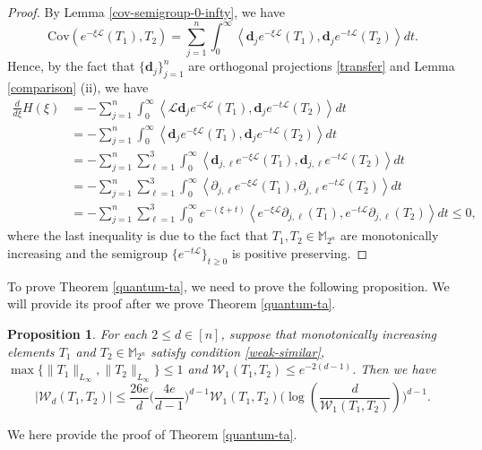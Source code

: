 \documentclass{amsbook}
\newtheorem{proposition}[theorem]{Proposition}
\theoremstyle{definition}
\theoremstyle{remark}
\numberwithin{section}{chapter}
\numberwithin{equation}{chapter}
\newcommand{\M}{\mathbb{M}}
\newcommand{\1}{\mathbf{1}}
\newcommand{\La}{\mathcal{L}}
\newcommand{\dc}{\mathbf{d}}
\begin{document}
\begin{proof}
 By Lemma \ref{cov-semigroup-0-infty}, we have
	\[
	\mathrm{Cov}\left(e^{-\xi\La}(T_1),T_2\right)=\sum_{j=1}^{n}\int_{0}^{\infty}\left\langle\dc_{j}e^{-\xi \La}(T_1),\dc_{j}e^{-t\La}(T_2)\right\rangle dt.
	\]
	Hence, by the fact that $\{\dc_{j}\}_{j=1}^{n}$ are orthogonal projections \eqref{transfer} and Lemma \ref{comparison} (ii), we have
	\begin{equation}\label{derivative-1}
		\begin{split}
			\frac{d}{d\xi}H(\xi)&=-\sum_{j=1}^{n}\int_{0}^{\infty}\left\langle\La\dc_{j}e^{-\xi\La}(T_1),\dc_{j}e^{-t\La}(T_2)\right\rangle dt\\
			&=-\sum_{j=1}^{n}\int_{0}^{\infty}\left\langle\dc_{j}e^{-\xi\La}(T_1),\dc_{j}e^{-t\La}(T_2)\right\rangle dt\\
			&=-\sum_{j=1}^{n}\sum_{\ell=1}^{3}\int_{0}^{\infty}\left\langle\dc_{j,\ell}e^{-\xi\La}(T_1),\dc_{j,\ell}e^{-t\La}(T_2)\right\rangle dt\\
			&=-\sum_{j=1}^{n}\sum_{\ell=1}^{3}\int_{0}^{\infty}\left\langle\partial_{j,\ell}e^{-\xi\La}(T_1),\partial_{j,\ell}e^{-t\La}(T_2)\right\rangle dt\\
			&=-\sum_{j=1}^{n}\sum_{\ell=1}^{3}\int_{0}^{\infty} e^{-(\xi+t)}\left\langle e^{-\xi\La}\partial_{j,\ell}(T_1),e^{-t\La}\partial_{j,\ell}(T_2)\right\rangle dt\leq 0,
		\end{split}
	\end{equation}
	where the last inequality is due to the fact that $T_1, T_2\in \M_{2^{n}}$ are monotonically increasing and the semigroup $\{e^{-t\La}\}_{t\geq 0}$ is positive preserving.
\end{proof}

To prove Theorem \ref{quantum-ta}, we need to prove the following proposition. We will provide its proof after we prove Theorem \ref{quantum-ta}.

\begin{proposition}\label{tala-correlation-pro1}  For each $2\leq d\in [n]$, suppose that monotonically increasing elements $T_1$ and $T_2\in \M_{2^{n}}$ satisfy condition \eqref{weak-similar}, $\max\{\|T_1\|_{L_{\infty}},\|T_2\|_{L_{\infty}}\}\leq 1$ and $\mathcal{W}_1(T_1,T_2)\leq e^{-2(d-1)}$.  Then we have
	$$|\mathcal{W}_d(T_1,T_2)|\leq \frac{26e}{d}\Big(\frac{4e}{d-1}\Big)^{d-1}\mathcal{W}_1(T_1,T_2)\Big(\log(\frac{d}{\mathcal{W}_1(T_1,T_2)})\Big)^{d-1}.$$
\end{proposition}


We here provide the proof of  Theorem \ref{quantum-ta}.
\end{document}
